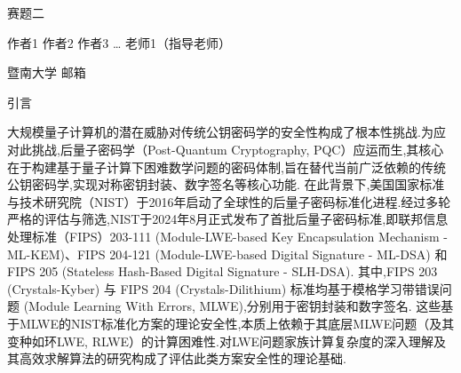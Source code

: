 \documentclass[12pt,a4paper]{article}
\newcommand{\fs}{\CJKfamily{fs}}
\numberwithin{equation}{section}
\begin{document}
\begin{center}
	{\heiti\fontsize{16pt}{24pt}\selectfont 赛题二}
\end{center}

\begin{center}
	{\fs\fontsize{12pt}{18pt}\selectfont 作者1 作者2 作者3 … 老师1（指导老师）}
\end{center}

\begin{center}
	{\songti\fontsize{10.5pt}{15.75pt}\selectfont 暨南大学 \; 邮箱}
\end{center}

\vspace{1em}




\vspace{1em}


\vspace{2em}

{\centering\heiti\fontsize{16pt}{24pt}\selectfont 引言\par}
\vspace{1em}


大规模量子计算机的潜在威胁对传统公钥密码学的安全性构成了根本性挑战.为应对此挑战,后量子密码学（Post-Quantum Cryptography, PQC）应运而生,其核心在于构建基于量子计算下困难数学问题的密码体制,旨在替代当前广泛依赖的传统公钥密码学,实现对称密钥封装、数字签名等核心功能.
在此背景下,美国国家标准与技术研究院（NIST）于2016年启动了全球性的后量子密码标准化进程.经过多轮严格的评估与筛选,NIST于2024年8月正式发布了首批后量子密码标准,即联邦信息处理标准（FIPS）203-111 (Module-LWE-based Key Encapsulation Mechanism - ML-KEM)、FIPS 204-121 (Module-LWE-based Digital Signature - ML-DSA) 和 FIPS 205 (Stateless Hash-Based Digital Signature - SLH-DSA).
其中,FIPS 203 (Crystals-Kyber) 与 FIPS 204 (Crystals-Dilithium) 标准均基于模格学习带错误问题 (Module Learning With Errors, MLWE),分别用于密钥封装和数字签名.
这些基于MLWE的NIST标准化方案的理论安全性,本质上依赖于其底层MLWE问题（及其变种如环LWE, RLWE）的计算困难性.对LWE问题家族计算复杂度的深入理解及其高效求解算法的研究构成了评估此类方案安全性的理论基础.
\end{document}
